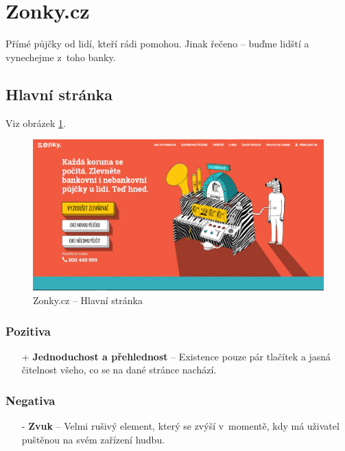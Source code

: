 \section{Zonky.cz}
\label{analyza:zonky}

Přímé půjčky od lidí, kteří rádi pomohou. Jinak řečeno -- buďme lidští a vynechejme z~toho banky.

\subsection{Hlavní stránka}
Viz obrázek \ref{fig:zonky:home}.
\begin{figure}[h]
    \centering
    \includegraphics[width=1.0\textwidth]{media/zonky/home.png}
    \caption{Zonky.cz -- Hlavní stránka}
    \label{fig:zonky:home}
\end{figure}
\subsubsection*{Pozitiva}
\begin{itemize}
    \item[+] \textbf{Jednoduchost a přehlednost} -- Existence pouze pár tlačítek a jasná čitelnost všeho, co se na dané stránce nachází.
\end{itemize}
\subsubsection*{Negativa}
\begin{itemize}
    \item[-] \textbf{Zvuk} -- Velmi rušivý element, který se zvýší v~momentě, kdy má uživatel puštěnou na svém zařízení hudbu.
\end{itemize}



